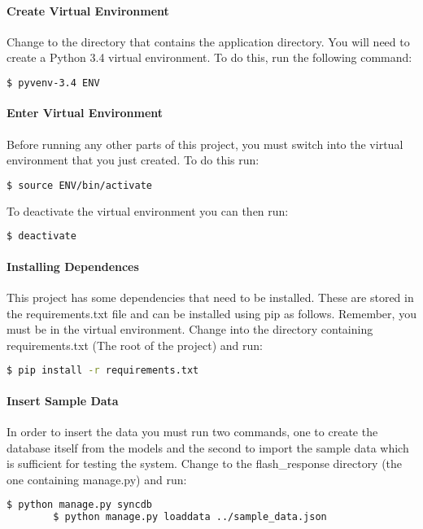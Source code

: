 \documentclass[10pt]{report}
\begin{document}
    \paragraph{Create Virtual Environment}
    Change to the directory that contains the application directory.  You will need to create a Python 3.4
    virtual environment.  To do this, run the following command:
    \begin{lstlisting}[language=bash]
    	$ pyvenv-3.4 ENV
    \end{lstlisting}
    
    \paragraph{Enter Virtual Environment}
    Before running any other parts of this project, you must switch into the virtual environment that you
    just created.  To do this run:
    \begin{lstlisting}[language=bash]
    	$ source ENV/bin/activate
    \end{lstlisting}
    To deactivate the virtual environment you can then run:
    \begin{lstlisting}[language=bash]
    	$ deactivate
    \end{lstlisting}
    
    \paragraph{Installing Dependences}
    This project has some dependencies that need to be installed.  These are stored in the 
    requirements.txt file and can be installed using pip as follows.  Remember, you must be in the virtual
    environment.  Change into the directory containing requirements.txt (The root of the project) and run:
    \begin{lstlisting}[language=bash]
    	$ pip install -r requirements.txt
    \end{lstlisting}
    
    \paragraph{Insert Sample Data}
    In order to insert the data you must run two commands, one to create the database itself from the
    models and the second to import the sample data which is sufficient for testing the system. Change to
    the flash\_response directory (the one containing manage.py) and run:
    \begin{lstlisting}[language=bash]
    	$ python manage.py syncdb
    	$ python manage.py loaddata ../sample_data.json
    \end{lstlisting}
\end{document}
